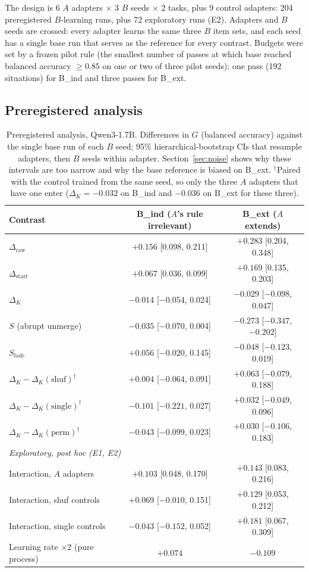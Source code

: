 \documentclass[11pt]{article}
\begin{document}
The design is 6 $A$ adapters $\times$ 3 $B$ seeds $\times$ 2 tasks, plus 9 control adapters: 204 preregistered $B$-learning runs, plus 72 exploratory runs (E2). Adapters and $B$ seeds are crossed: every adapter learns the same three $B$ item sets, and each seed has a single base run that serves as the reference for every contrast. Budgets were set by a frozen pilot rule (the smallest number of passes at which base reached balanced accuracy $\ge0.85$ on one or two of three pilot seeds): one pass (192 situations) for B\_ind and three passes for B\_ext.

\subsection{Preregistered analysis}

\begin{table}[tb]\centering\small
\begin{tabular}{lcc}
\toprule
Contrast & B\_ind ($A$'s rule irrelevant) & B\_ext ($A$ extends) \\
\midrule
$\Delta_{\text{raw}}$ & $+0.156$ [0.098, 0.211] & $+0.283$ [0.204, 0.348] \\
$\Delta_{\text{start}}$ & $+0.067$ [0.036, 0.099] & $+0.169$ [0.135, 0.203] \\
$\Delta_K$ & $-0.014$ [$-0.054$, 0.024] & $-0.029$ [$-0.098$, 0.047] \\
$S$ (abrupt unmerge) & $-0.035$ [$-0.070$, 0.004] & $-0.273$ [$-0.347$, $-0.202$] \\
$S_{\text{fade}}$ & $+0.056$ [$-0.020$, 0.145] & $-0.048$ [$-0.123$, 0.019] \\
$\Delta_K-\Delta_K(\text{shuf})^\dagger$ & $+0.004$ [$-0.064$, 0.091] & $+0.063$ [$-0.079$, 0.188] \\
$\Delta_K-\Delta_K(\text{single})^\dagger$ & $-0.101$ [$-0.221$, 0.027] & $+0.032$ [$-0.049$, 0.096] \\
$\Delta_K-\Delta_K(\text{perm})^\dagger$ & $-0.043$ [$-0.099$, 0.023] & $+0.030$ [$-0.106$, 0.183] \\
\midrule
\multicolumn{3}{l}{\emph{Exploratory, post hoc (E1, E2)}}\\
Interaction, $A$ adapters & $+0.103$ [0.048, 0.170] & $+0.143$ [0.083, 0.216] \\
Interaction, shuf controls & $+0.069$ [$-0.010$, 0.151] & $+0.129$ [0.053, 0.212] \\
Interaction, single controls & $-0.043$ [$-0.152$, 0.052] & $+0.181$ [0.067, 0.309] \\
Learning rate $\times2$ (pure process) & $+0.074$ & $-0.109$ \\
\bottomrule
\end{tabular}
\caption{Preregistered analysis, Qwen3-1.7B. Differences in $G$ (balanced accuracy) against the single base run of each $B$ seed; 95\% hierarchical-bootstrap CIs that resample adapters, then $B$ seeds within adapter. Section~\ref{sec:noise} shows why these intervals are too narrow and why the base reference is biased on B\_ext. $^\dagger$Paired with the control trained from the same seed, so only the three $A$ adapters that have one enter ($\Delta_K=-0.032$ on B\_ind and $-0.036$ on B\_ext for these three).}\label{tab:stage2}
\end{table}
\end{document}
